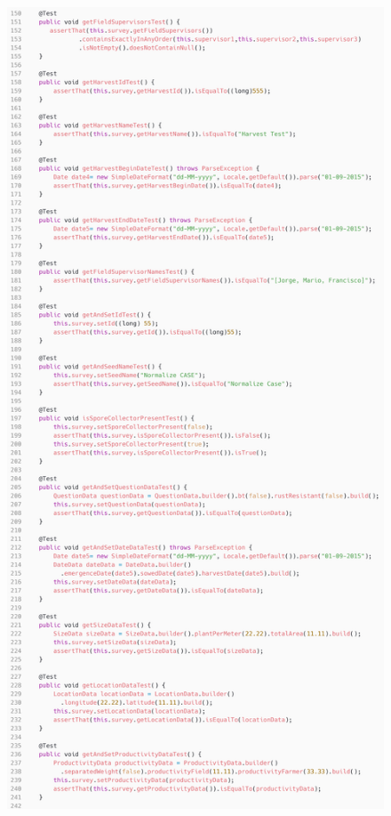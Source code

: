 \begin{figure}[H]
	\centering
	\includegraphics[scale=0.13]{dados/figuras/surveyTest2.png}
\end{figure}

